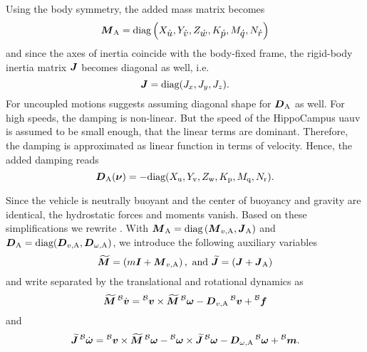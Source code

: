 Using the body symmetry, the added mass matrix becomes 
\begin{equation}
	\mbox{$\bm{M}$}_\text{A} =
	\text{diag}\left(X_{\mbox{$\dot{u}$}}, Y_{\mbox{$\dot{v}$}}, Z_{\mbox{$\dot{w}$}}, K_{\mbox{$\dot{p}$}}, M_{\mbox{$\dot{q}$}}, N_{\mbox{$\dot{r}$}}\right)
\end{equation}
and since the axes of inertia coincide with the body-fixed frame, the rigid-body inertia matrix $\mbox{$\bm{J}$}$ becomes diagonal as well, i.e.
\begin{equation}
	\mbox{$\bm{J}$} = \text{diag}(J_x, J_y, J_z)
	.
\end{equation}
For uncoupled motions \cite{Fossen11} suggests assuming diagonal shape for $\mbox{$\bm{D}$}_\text{A}$ as well. For high speeds, the damping is non-linear. But the speed of the HippoCampus \ac{uauv} is assumed to be small enough, that the linear terms are dominant. Therefore, the damping is approximated as linear function in terms of velocity.
Hence, the added damping reads
\begin{equation}
	\mbox{$\bm{D}$}_\text{A}(\mbox{$\bm{\nu}$}) = -\text{diag}(X_\text{u}, Y_\text{v}, Z_\text{w}, K_\text{p}, M_\text{q}, N_\text{r})
    .
\end{equation}

Since the vehicle is neutrally buoyant and the center of buoyancy and gravity are identical, the hydrostatic forces and moments vanish. Based on these simplifications we rewrite . With $\mbox{$\bm{M}$}_\text{A} = \text{diag}\left(\mbox{$\bm{M}$}_{v, \text{A}}, \mbox{$\bm{J}$}_\text{A}\right)$ and $\mbox{$\bm{D}$}_\text{A} = \text{diag}(\mbox{$\bm{D}$}_{v,\text{A}}, \mbox{$\bm{D}$}_{\omega,\text{A}})$, we introduce the following auxiliary variables
\begin{equation}
	\mbox{$\widetilde{\bm{M}}$} = \left(m\mbox{$\bm{I}$} + \mbox{$\bm{M}$}_{v, \text{A}}\right),\text{ and }
	\mbox{$\widetilde{\bm{J}}$} = \left(\mbox{$\bm{J}$} + \mbox{$\bm{J}$}_\text{A}\right)
\end{equation}
and write  separated by the translational and rotational dynamics as
\begin{equation}
	\label{eq:equation-of-motion-translational}
	\Mbs \vlinbodydot =
	\vlinbody \times \Mbs \vangbody
	-\Dvadded \vlinbody
	+ \prescript{\mathcal{B}}{}{\fb}
\end{equation}
and
\begin{equation}
	\label{eq:equation-of-motion-rotational}
	\Jbs \vangbodydot =
	\vlinbody \times \Mbs \vangbody
	- \vangbody \times \Jbs \vangbody
	- \Domegaadded \vangbody
	+ \prescript{\mathcal{B}}{}{\mb}
	.
\end{equation}

